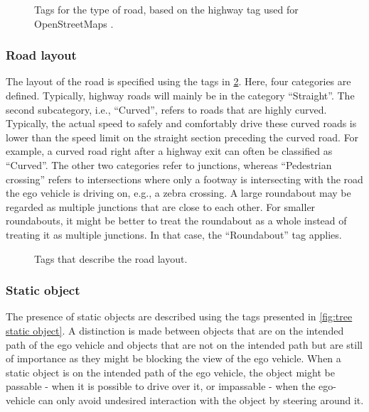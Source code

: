 \begin{figure}
	\centering
	\caption{Tags for the type of road, based on the highway tag used for OpenStreetMaps \cite{osm_highway}.}
	\label{fig:tree road type}
\end{figure}

\subsubsection{Road layout}
The layout of the road is specified using the tags in \cref{fig:tree road layout}. Here, four categories are defined. Typically, highway roads will mainly be in the category ``Straight''. The second subcategory, i.e., ``Curved'', refers to roads that are highly curved. Typically, the actual speed to safely and comfortably drive these curved roads is lower than the speed limit on the straight section preceding the curved road. For example, a curved road right after a highway exit can often be classified as ``Curved''. The other two categories refer to junctions, whereas ``Pedestrian crossing'' refers to intersections where only a footway is intersecting with the road the ego vehicle is driving on, e.g., a zebra crossing. A large roundabout may be regarded as multiple junctions that are close to each other. For smaller roundabouts, it might be better to treat the roundabout as a whole instead of treating it as multiple junctions. In that case, the ``Roundabout'' tag applies.

\begin{figure}
	\centering
	\caption{Tags that describe the road layout.}
	\label{fig:tree road layout}
\end{figure}

\subsubsection{Static object}
The presence of static objects are described using the tags presented in \cref{fig:tree static object}. A distinction is made between objects that are on the intended path of the ego vehicle and objects that are not on the intended path but are still of importance as they might be blocking the view of the ego vehicle. When a static object is on the intended path of the ego vehicle, the object might be passable - when it is possible to drive over it, or impassable - when the ego-vehicle can only avoid undesired interaction with the object by steering around it.

